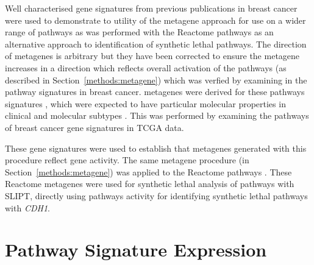 Well characterised gene signatures from previous publications in breast cancer \citep{Gatza2011, Gatza2014} were used to demonstrate to utility of the \gls{metagene} approach for use on a wider range of \glspl{pathway} as was performed with the Reactome \citep{Reactome} \glspl{pathway} as an alternative approach to identification of \gls{synthetic lethal} \glspl{pathway}. The direction of \glspl{metagene} is arbitrary but they have been corrected to ensure the metagene increases in a direction which reflects overall activation of the \glspl{pathway} (as described in Section~\ref{methods:metagene}) which was verfied by examining in the pathway signatures in breast cancer.
%
\Glspl{metagene} were derived for %
these \glspl{pathway} signatures \citep{Gatza2011, Gatza2014}, which were expected to have particular molecular properties in clinical and molecular subtypes \citep{Perou2000, Parker2009}. This was performed by examining the \glspl{pathway}  of breast cancer gene signatures in \gls{TCGA}  data. %

These gene signatures were used to establish that \glspl{metagene} generated with this procedure reflect gene activity. The same \gls{metagene} procedure (in Section~\ref{methods:metagene}) was applied to the Reactome \glspl{pathway} \citep{Reactome}. These Reactome \glspl{metagene} were used for \gls{synthetic lethal} analysis of \glspl{pathway} with \gls{SLIPT}, directly using \glspl{pathway} activity for identifying \gls{synthetic lethal} \glspl{pathway} with \textit{CDH1}.

\section{Pathway Signature Expression} \label{chapt3:metagene_expression}

